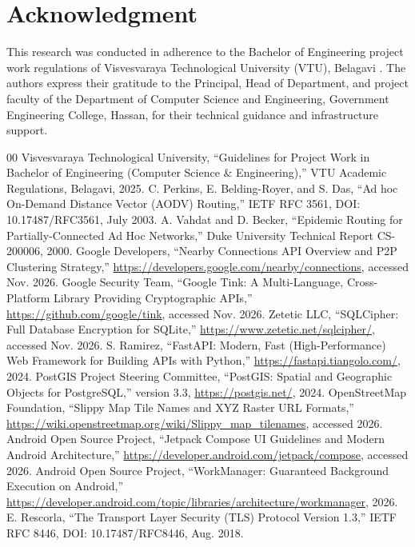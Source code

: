 \documentclass[conference,a4paper]{IEEEtran}
\begin{document}
\section*{Acknowledgment}
This research was conducted in adherence to the Bachelor of Engineering project work regulations of Visvesvaraya Technological University (VTU), Belagavi \cite{1}. The authors express their gratitude to the Principal, Head of Department, and project faculty of the Department of Computer Science and Engineering, Government Engineering College, Hassan, for their technical guidance and infrastructure support.

\begin{thebibliography}{00}
 Visvesvaraya Technological University, ``Guidelines for Project Work in Bachelor of Engineering (Computer Science \& Engineering),'' VTU Academic Regulations, Belagavi, 2025.
 C. Perkins, E. Belding-Royer, and S. Das, ``Ad hoc On-Demand Distance Vector (AODV) Routing,'' IETF RFC 3561, DOI: 10.17487/RFC3561, July 2003.
 A. Vahdat and D. Becker, ``Epidemic Routing for Partially-Connected Ad Hoc Networks,'' Duke University Technical Report CS-200006, 2000.
 Google Developers, ``Nearby Connections API Overview and P2P Clustering Strategy,'' \url{https://developers.google.com/nearby/connections}, accessed Nov. 2026.
 Google Security Team, ``Google Tink: A Multi-Language, Cross-Platform Library Providing Cryptographic APIs,'' \url{https://github.com/google/tink}, accessed Nov. 2026.
 Zetetic LLC, ``SQLCipher: Full Database Encryption for SQLite,'' \url{https://www.zetetic.net/sqlcipher/}, accessed Nov. 2026.
 S. Ramirez, ``FastAPI: Modern, Fast (High-Performance) Web Framework for Building APIs with Python,'' \url{https://fastapi.tiangolo.com/}, 2024.
 PostGIS Project Steering Committee, ``PostGIS: Spatial and Geographic Objects for PostgreSQL,'' version 3.3, \url{https://postgis.net/}, 2024.
 OpenStreetMap Foundation, ``Slippy Map Tile Names and XYZ Raster URL Formats,'' \url{https://wiki.openstreetmap.org/wiki/Slippy_map_tilenames}, accessed 2026.
 Android Open Source Project, ``Jetpack Compose UI Guidelines and Modern Android Architecture,'' \url{https://developer.android.com/jetpack/compose}, accessed 2026.
 Android Open Source Project, ``WorkManager: Guaranteed Background Execution on Android,'' \url{https://developer.android.com/topic/libraries/architecture/workmanager}, 2026.
 E. Rescorla, ``The Transport Layer Security (TLS) Protocol Version 1.3,'' IETF RFC 8446, DOI: 10.17487/RFC8446, Aug. 2018.

\end{thebibliography}
\end{document}
